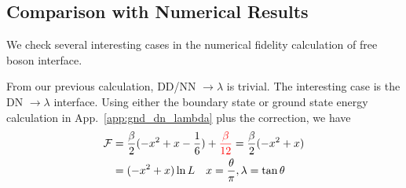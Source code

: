 \documentclass{article}
\begin{document}
\subsection{Comparison with Numerical Results}

We check several interesting cases in the numerical fidelity calculation of free boson interface. 

From our previous calculation, DD/NN $\rightarrow \lambda$ is trivial. The interesting case is the DN $\rightarrow \lambda$ interface. Using either the boundary state or ground state energy calculation in App.~\ref{app:gnd_dn_lambda} plus the correction, we have
\begin{equation}
\begin{aligned}
\mathcal{F} &= \frac{\beta}{2}( - x^2 + x - \frac{1}{6} ) + {\color{red} \frac{\beta}{12}} = \frac{\beta}{2}( - x^2 + x ) \\
&= ( - x^2 + x ) \ln L  \quad x = \frac{\theta}{\pi}, \lambda = \tan \theta 
\end{aligned}
\end{equation}
\end{document}
